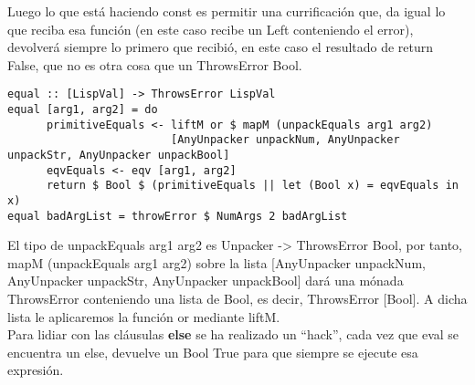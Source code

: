 Luego lo que est\'a haciendo const es permitir una currificaci\'on que, da igual lo que reciba esa funci\'on (en este caso recibe un Left conteniendo el error), devolver\'a siempre lo primero que recibi\'o, en este caso el resultado de return False, que no es otra cosa que un ThrowsError Bool.\\

\begin{minipage}{\linewidth}
\begin{small}
\begin{lstlisting}[frame=single]
equal :: [LispVal] -> ThrowsError LispVal
equal [arg1, arg2] = do
      primitiveEquals <- liftM or $ mapM (unpackEquals arg1 arg2) 
                         [AnyUnpacker unpackNum, AnyUnpacker unpackStr, AnyUnpacker unpackBool]
      eqvEquals <- eqv [arg1, arg2]
      return $ Bool $ (primitiveEquals || let (Bool x) = eqvEquals in x)
equal badArgList = throwError $ NumArgs 2 badArgList
\end{lstlisting}
\end{small}
\end{minipage}

El tipo de unpackEquals arg1 arg2 es Unpacker -> ThrowsError Bool, por tanto, mapM (unpackEquals arg1 arg2) sobre la lista [AnyUnpacker unpackNum, AnyUnpacker unpackStr, AnyUnpacker unpackBool] dar\'a una m\'onada ThrowsError conteniendo una lista de Bool, es decir, ThrowsError [Bool]. A dicha lista le aplicaremos la funci\'on or mediante liftM.\\

Para lidiar con las cl\'ausulas \textbf{else} se ha realizado un ``hack'', cada vez que eval se encuentra un else, devuelve un Bool True para que siempre se ejecute esa expresi\'on.\\